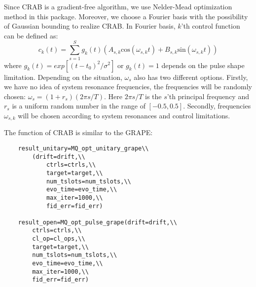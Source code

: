 Since CRAB is a gradient-free algorithm, we use Nelder-Mead optimization method in this package. Moreover, we choose a Fourier basis with the possibility of Gaussian bounding to realize CRAB. In Fourier basis, $k$'th control function can be defined as:
\begin{equation}
    c_{k}(t)=\sum_{s=1}^{S}g_{k}(t)(A_{s,k}\mathrm{cos}(\omega_{s,k}t)+B_{s,k}\mathrm{sin}(\omega_{s,k}t))
\end{equation}
where $g_{k}(t)=exp\left[(t-t_{0})^{2}/\sigma^{2}\right]$ or $g_{k}(t)=1$ depends on the pulse shape limitation. Depending on the situation, $\omega_{s}$ also has two different options. Firstly, we have no idea of system resonance frequencies, the frequencies will be randomly chosen: $\omega_{s}=(1+r_s)(2\pi s/T)$. Here $2\pi s/T$ is the $s$'th principal frequency and $r_s$ is a uniform random number in the range of $[-0.5,0.5]$. Secondly, frequencies ${\omega_{s,k}}$ will be chosen according to system resonances and control limitations.

The function of CRAB is similar to the GRAPE:
\begin{lstlisting}
    result_unitary=MQ_opt_unitary_grape\\
        (drift=drift,\\
            ctrls=ctrls,\\
            target=target,\\
            num_tslots=num_tslots,\\
            evo_time=evo_time,\\
            max_iter=1000,\\
            fid_err=fid_err)

    result_open=MQ_opt_pulse_grape(drift=drift,\\
        ctrls=ctrls,\\
        cl_op=cl_ops,\\
        target=target,\\
        num_tslots=num_tslots,\\
        evo_time=evo_time,\\
        max_iter=1000,\\
        fid_err=fid_err)
\end{lstlisting}

